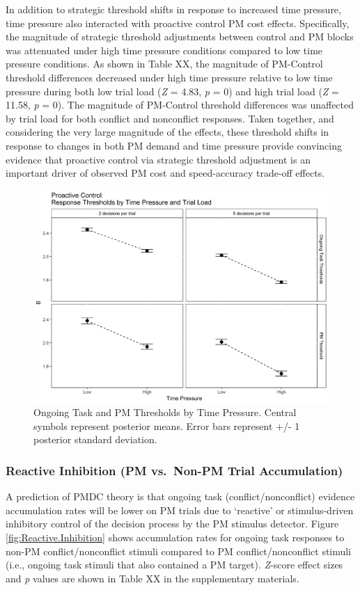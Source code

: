 \documentclass[11pt,]{article}
\begin{document}
In addition to strategic threshold shifts in response to increased time
pressure, time pressure also interacted with proactive control PM cost
effects. Specifically, the magnitude of strategic threshold adjustments
between control and PM blocks was attenuated under high time pressure
conditions compared to low time pressure conditions. As shown in Table
XX, the magnitude of PM-Control threshold differences decreased under
high time pressure relative to low time pressure during both low trial
load (\emph{Z} = 4.83, \emph{p} = 0) and high trial load (\emph{Z} =
11.58, \emph{p} = 0). The magnitude of PM-Control threshold differences
was unaffected by trial load for both conflict and nonconflict
responses. Taken together, and considering the very large magnitude of
the effects, these threshold shifts in response to changes in both PM
demand and time pressure provide convincing evidence that proactive
control via strategic threshold adjustment is an important driver of
observed PM cost and speed-accuracy trade-off effects.

\begin{figure}
\includegraphics[width=0.8\linewidth]{figures/E1/E1.Proactive.Control.TP} \caption{\label{fig:Proactive.Control.TP}Ongoing Task and PM Thresholds by Time Pressure. Central symbols represent posterior means. Error bars represent +/- 1 posterior standard deviation.}\label{fig:Plot: Proactive Control TP}
\end{figure}

\subsubsection{Reactive Inhibition (PM vs.~Non-PM Trial
Accumulation)}\label{reactive-inhibition-pm-vs.non-pm-trial-accumulation}

A prediction of PMDC theory is that ongoing task (conflict/nonconflict)
evidence accumulation rates will be lower on PM trials due to `reactive'
or stimulus-driven inhibitory control of the decision process by the PM
stimulus detector. Figure \ref{fig:Reactive.Inhibition} shows
accumulation rates for ongoing task responses to non-PM
conflict/nonconflict stimuli compared to PM conflict/nonconflict stimuli
(i.e., ongoing task stimuli that also contained a PM target).
\emph{Z}-score effect sizes and \emph{p} values are shown in Table XX in
the supplementary materials.
\end{document}
